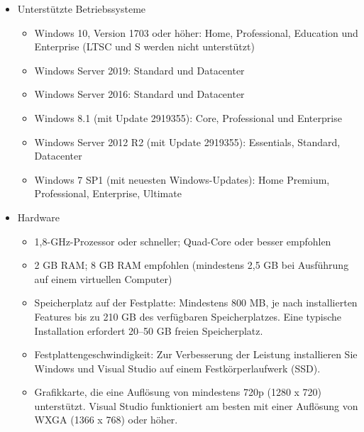 \begin{itemize}
    \item Unterstützte Betriebssysteme
        \begin{itemize}
            \item Windows 10, Version 1703 oder höher: Home, Professional, Education und Enterprise (LTSC und S werden nicht unterstützt)
            \item Windows Server 2019: Standard und Datacenter
            \item Windows Server 2016: Standard und Datacenter
            \item Windows 8.1 (mit Update 2919355): Core, Professional und Enterprise
            \item Windows Server 2012 R2 (mit Update 2919355): Essentials, Standard, Datacenter
            \item Windows 7 SP1 (mit neuesten Windows-Updates): Home Premium, Professional, Enterprise, Ultimate
        \end{itemize}
    \item Hardware
        \begin{itemize}
            \item 1,8-GHz-Prozessor oder schneller; Quad-Core oder besser empfohlen
            \item 2 GB RAM; 8 GB RAM empfohlen (mindestens 2,5 GB bei Ausführung auf einem virtuellen Computer)
            \item Speicherplatz auf der Festplatte: Mindestens 800 MB, je nach installierten Features bis zu 210 GB des verfügbaren Speicherplatzes. Eine typische Installation erfordert 20–50 GB freien Speicherplatz.
            \item Festplattengeschwindigkeit: Zur Verbesserung der Leistung installieren Sie Windows und Visual Studio auf einem Festkörperlaufwerk (SSD).
            \item Grafikkarte, die eine Auflösung von mindestens 720p (1280 x 720) unterstützt. Visual Studio funktioniert am besten mit einer Auflösung von WXGA (1366 x 768) oder höher.
        \end{itemize}
\end{itemize}



